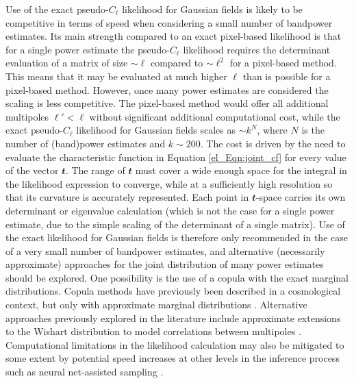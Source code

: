 Use of the exact pseudo-$C_\ell$ likelihood for Gaussian fields is likely to be competitive in terms of speed when considering a small number of bandpower estimates. Its main strength compared to an exact pixel-based likelihood is that for a single power estimate the pseudo-$C_\ell$ likelihood requires the determinant evaluation of a matrix of size $\sim \ell$ compared to $\sim \ell^2$ for a pixel-based method. This means that it may be evaluated at much higher $\ell$ than is possible for a pixel-based method. However, once many power estimates are considered the scaling is less competitive. The pixel-based method would offer all additional multipoles $\ell' < \ell$ without significant additional computational cost, while the exact pseudo-$C_\ell$ likelihood for Gaussian fields scales as $\sim k^N$, where $N$ is the number of (band)power estimates and $k \sim 200$. The cost is driven by the need to evaluate the characteristic function in Equation \eqref{el_Eqn:joint_cf} for every value of the vector $\mathbfit{t}$. The range of $\mathbfit{t}$ must cover a wide enough space for the integral in the likelihood expression to converge, while at a sufficiently high resolution so that its curvature is accurately represented. Each point in $\mathbfit{t}$-space carries its own determinant or eigenvalue calculation (which is not the case for a single power estimate, due to the simple scaling of the determinant of a single matrix).
Use of the exact likelihood for Gaussian fields is therefore only recommended in the case of a very small number of bandpower estimates, and alternative (necessarily approximate) approaches for the joint distribution of many power estimates should be explored. One possibility is the use of a copula with the exact marginal distributions.
Copula methods have previously been described in a cosmological context, but only with approximate marginal distributions \citep{Benabed2009, Sato2010, Sato2011}. Alternative approaches previously explored in the literature include approximate extensions to the Wishart distribution to model correlations between multipoles \citep{Hamimeche2008, Mangilli2015}. Computational limitations in the likelihood calculation may also be mitigated to some extent by potential speed increases at other levels in the inference process such as neural net-assisted sampling \citep{Manrique-Yus2020}.

